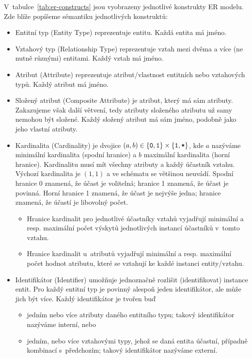 V~tabulce~\ref{tab:er-constructs} jsou vyobrazeny jednotlivé konstrukty ER modelu.
Zde blíže popíšeme sémantiku jednotlivých konstruktů:
\begin{itemize}
  \item Entitní typ (Entity Type) reprezentuje entitu.
        Každá entita má jméno.
  \item Vztahový typ (Relationship Type) reprezentuje vztah mezi dvěma a více (ne nutně různými) entitami.
        Každý vztah má jméno.
  \item Atribut (Attribute) reprezentuje atribut/vlastnost entitních nebo vztahových typů.
        Každý atribut má jméno.
  \item Složený atribut (Composite Attribute) je atribut, který má sám atributy.
        Zakazujeme však další větvení, tedy atributy složeného atributu už samy nemohou být složené.
        Každý složený atribut má sám jméno, podobně jako jeho vlastní atributy.
  \item Kardinalita (Cardinality) je dvojice $(a, b) \in \left\{\texttt{0}, \texttt{1}\right\}\times \left\{\texttt{1}, \texttt{*}\right\}$, kde $a$ nazýváme minimální kardinalita (spodní hranice) a $b$ maximální kardinalita (horní hranice).
        Kardinalitu musí mít všechny atributy a každý účastník vztahu.
        Výchozí kardinalita je $(1, 1)$ a ve schématu se většinou neuvádí.
        Spodní hranice 0 znamená, že účast je volitelná; hranice 1 znamená, že účast je povinná.
        Horní hranice 1 znamená, že účast je nejvýše jedna; hranice~\many{} znamená, že účastí je libovolný počet.
        \begin{itemize}
          \item Hranice kardinalit pro jednotlivé účastníky vztahů vyjadřují minimální a resp. maximální počet výskytů jednotlivých instancí účastníků v~tomto vztahu.
          \item Hranice kardinalit u~atributů vyjadřují minimální a resp. maximální počet hodnot atributu, které se vztahují ke každé instanci entity/vztahu.
        \end{itemize}
  \item Identifikátor (Identifier) umožňuje jednoznačně rozlišit (identifikovat) instance entit.
        Pro každý entitní typ je povinný alespoň jeden identifikátor, ale může jich být více.
        Každý identifikátor je tvořen buď
        \begin{itemize}
          \item jedním nebo více atributy daného entitního typu; takový identifikátor nazýváme interní, nebo
          \item jedním, nebo více vztahovými typy, jehož se daná entita účastní, případně kombinací s~předchozím; takový identifikátor nazýváme externí.
        \end{itemize}
\end{itemize}

